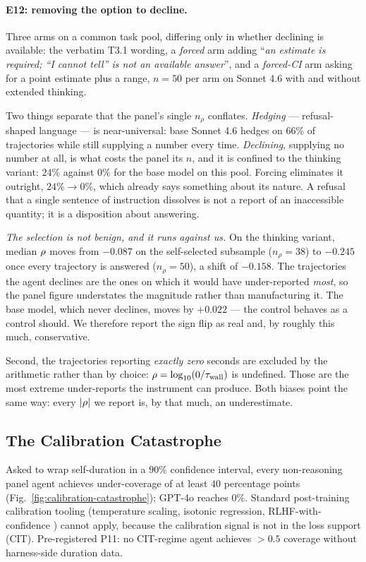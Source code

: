 \paragraph{E12: removing the option to decline.} Three arms on a common task
pool, differing only in whether declining is available: the verbatim T3.1
wording, a \emph{forced} arm adding ``\textit{an estimate is required;
``I cannot tell'' is not an available answer}'', and a \emph{forced-CI} arm
asking for a point estimate plus a range, $n = 50$ per arm on Sonnet 4.6 with
and without extended thinking.

Two things separate that the panel's single $n_\rho$ conflates. \emph{Hedging}
--- refusal-shaped language --- is near-universal: base Sonnet 4.6 hedges on
$66\%$ of trajectories while still supplying a number every time. \emph{Declining},
supplying no number at all, is what costs the panel its $n$, and it is confined
to the thinking variant: $24\%$ against $0\%$ for the base model on this pool.
Forcing eliminates it outright, $24\% \to 0\%$, which already says something
about its nature. A refusal that a single sentence of instruction dissolves is
not a report of an inaccessible quantity; it is a disposition about answering.

\emph{The selection is not benign, and it runs against us.} On the thinking
variant, median $\rho$ moves from $-0.087$ on the self-selected subsample
($n_\rho = 38$) to $-0.245$ once every trajectory is answered ($n_\rho = 50$),
a shift of $-0.158$. The trajectories the agent declines are the ones on which
it would have under-reported \emph{most}, so the panel figure understates the
magnitude rather than manufacturing it. The base model, which never declines,
moves by $+0.022$ --- the control behaves as a control should. We therefore
report the sign flip as real and, by roughly this much, conservative.

Second, the trajectories reporting \emph{exactly zero} seconds are excluded by
the arithmetic rather than by choice: $\rho = \log_{10}(0/\tau_{\mathrm{wall}})$ is
undefined. Those are the most extreme under-reports the instrument can produce.
Both biases point the same way: every $|\rho|$ we report is, by that much,
an underestimate.

\subsection{The Calibration Catastrophe}
\label{ssec:calibration}

Asked to wrap self-duration in a $90\%$ confidence interval, every non-reasoning panel agent achieves under-coverage of at least $40$ percentage points (Fig.~\ref{fig:calibration-catastrophe}); GPT-4o reaches $0\%$. Standard post-training calibration tooling (temperature scaling, isotonic regression, RLHF-with-confidence \citep{guo2017calibration,jiang2021calibration,kadavath2022knowing,dontthinktwice2025}) cannot apply, because the calibration signal is not in the loss support (CIT). Pre-registered P11: no CIT-regime agent achieves $> 0.5$ coverage without harness-side duration data.

